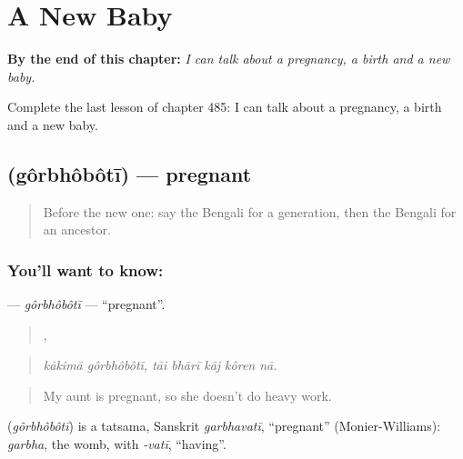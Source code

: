 
\chapter{A New Baby}
\label{ch:bn-a-new-baby}

\begin{chapteropening}
\textbf{By the end of this chapter:} \emph{I can talk about a pregnancy, a birth and a new baby.}

Complete the last lesson of chapter 485: I can talk about a pregnancy, a birth and a new baby.
\end{chapteropening}

\section[\texorpdfstring{\bn{গর্ভবতী} (gôrbhôbôtī)}{গর্ভবতী (gôrbhôbôtī)}]{ (gôrbhôbôtī) — pregnant}

\label{lesson:BN-C485-gorbhoboti}



\begin{quote}
Before the new one: say the Bengali for a generation, then the Bengali for an ancestor.
\end{quote}

\subsection*{You'll want to know: }
\textbf{} — \emph{gôrbhôbôtī} — \textquotedblleft{}pregnant\textquotedblright{}.

\begin{quote}
 ,     
\end{quote}

\begin{quote}
\emph{kākimā gôrbhôbôtī, tāi bhārī kāj kôren nā.}
\end{quote}

\begin{quote}
My aunt is pregnant, so she doesn't do heavy work.
\end{quote}

\begin{cousinweb}
\textbf{} (\emph{gôrbhôbôtī}) is a tatsama, Sanskrit \emph{garbhavatī}, \textquotedblleft{}pregnant\textquotedblright{} (Monier-Williams): \emph{garbha}, the womb, with \emph{-vatī}, \textquotedblleft{}having\textquotedblright{}.
\end{cousinweb}


